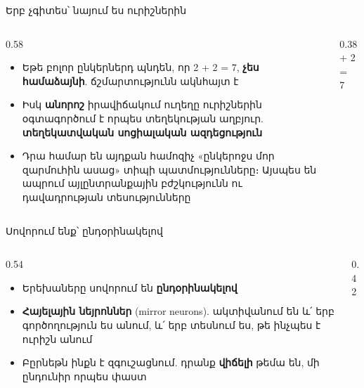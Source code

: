 \begin{frame}{Երբ չգիտես՝ նայում ես ուրիշներին}
  \begin{columns}[c]
    \begin{column}{0.58\textwidth}
      \begin{itemize}
        \item Եթե բոլոր ընկերներդ պնդեն, որ 2 + 2 = 7, \textbf{չես համաձայնի}. ճշմարտությունն ակնհայտ է
        \item<2-> Իսկ \textbf{անորոշ} իրավիճակում ուղեղը ուրիշներին օգտագործում է որպես տեղեկության աղբյուր. \textbf{տեղեկատվական սոցիալական ազդեցություն}
        \item<3-> Դրա համար են այդքան համոզիչ «ընկերոջս մոր զարմուհին ասաց» տիպի պատմությունները։ Այսպես են ապրում այլընտրանքային բժշկությունն ու դավադրության տեսությունները
      \end{itemize}
    \end{column}
    \begin{column}{0.38\textwidth}
      \centering
      {\blackfont\fontsize{30}{32} + 2 = 7}\ \par\bigskip
    \end{column}
  \end{columns}
\end{frame}

\begin{frame}{Սովորում ենք՝ ընդօրինակելով}
  \begin{columns}[T]
    \begin{column}{0.54\textwidth}
      \begin{itemize}
        \item Երեխաները սովորում են \textbf{ընդօրինակելով}
        \item \textbf{Հայելային նեյրոններ} (mirror neurons). ակտիվանում են և՛ երբ գործողություն ես անում, և՛ երբ տեսնում ես, թե ինչպես է ուրիշն անում
        \item Բըրնեթն ինքն է զգուշացնում. դրանք \textbf{վիճելի} թեմա են, մի ընդունիր որպես փաստ
      \end{itemize}
    \end{column}
    \begin{column}{0.42\textwidth}
    \end{column}
  \end{columns}
\end{frame}


